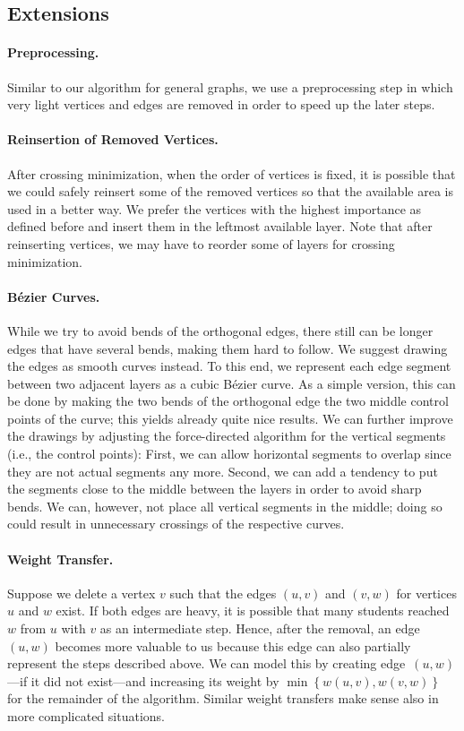 \documentclass[]{llncs}
\begin{document}
\subsection{Extensions}

\paragraph{Preprocessing.}
Similar to our algorithm for general graphs, we use a preprocessing
step in which very light vertices and edges are removed in order to
speed up the later steps.


\paragraph{Reinsertion of Removed Vertices.}
After crossing minimization, when the order of vertices is
fixed, it is possible that we could safely reinsert some of the
removed vertices so that the available area is used in a better way.
We prefer the vertices with the highest importance as
defined before and insert them in the leftmost available layer.
Note that after reinserting vertices, we may
have to reorder some of layers for crossing minimization.

\paragraph{B\'ezier Curves.}
While we try to avoid bends of the orthogonal edges, there still can
be longer edges that have several bends, making them hard to follow.
We suggest drawing the edges as smooth curves
instead. To this end, we represent each edge segment between two
adjacent layers as a cubic B\'ezier curve. As a simple
version, this can be done by making the two bends of the orthogonal
edge the two middle control points of the curve; this yields already quite
nice results. We can further improve the drawings by
adjusting the force-directed algorithm for the vertical segments
(i.e., the control points): First, we can allow horizontal segments
to overlap since they are not actual segments any more. Second, we can
add a tendency to put the segments close to the middle between the
layers in order to avoid sharp bends. We can, however, not place all
vertical segments in the middle; doing so could result in unnecessary
crossings of the respective curves.

\paragraph{Weight Transfer.}
Suppose we delete a vertex $v$ such that the edges
$(u,v)$ and $(v,w)$ for vertices $u$ and $w$ exist. If both edges are
heavy, it is possible that many students reached $w$ from $u$ with
$v$ as an intermediate step. Hence, after the removal, an edge
$(u,w)$ becomes more valuable to us because this edge can also
partially represent the steps described above. We can
model this by creating edge~$(u,w)$---if it did not exist---and
increasing its weight by $\min\left\{ w(u,v), w(v,w) \right\}$ for the
remainder of the algorithm. Similar weight transfers make sense also
in more complicated situations.
\end{document}
